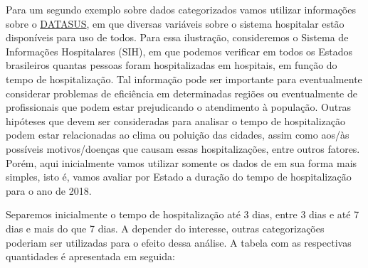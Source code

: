 \documentclass[]{book}
\begin{document}
Para um segundo exemplo sobre dados categorizados vamos utilizar informações sobre o \href{http://datasus.saude.gov.br/}{DATASUS}, em que diversas variáveis sobre o sistema hospitalar estão disponíveis para uso de todos. Para essa ilustração, consideremos o Sistema de Informações Hospitalares (SIH), em que podemos verificar em todos os Estados brasileiros quantas pessoas foram hospitalizadas em hospitais, em função do tempo de hospitalização. Tal informação pode ser importante para eventualmente considerar problemas de eficiência em determinadas regiões ou eventualmente de profissionais que podem estar prejudicando o atendimento à população. Outras hipóteses que devem ser consideradas para analisar o tempo de hospitalização podem estar relacionadas ao clima ou poluição das cidades, assim como aos/às possíveis motivos/doenças que causam essas hospitalizações, entre outros fatores. Porém, aqui inicialmente vamos utilizar somente os dados de em sua forma mais simples, isto é, vamos avaliar por Estado a duração do tempo de hospitalização para o ano de 2018.

Separemos inicialmente o tempo de hospitalização até 3 dias, entre 3 dias e até 7 dias e mais do que 7 dias. A depender do interesse, outras categorizações poderiam ser utilizadas para o efeito dessa análise. A tabela com as respectivas quantidades é apresentada em seguida:
\end{document}

